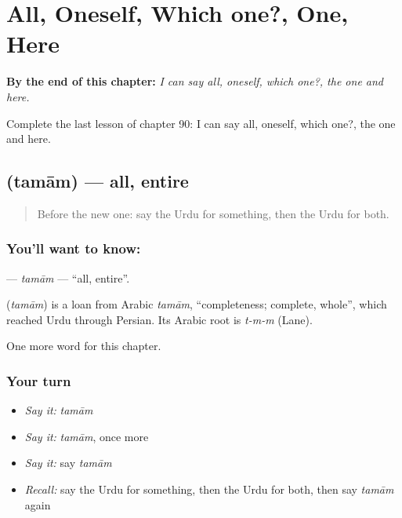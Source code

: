 
\chapter{All, Oneself, Which one?, One, Here}
\label{ch:ur-all-oneself-which-one-one-here}

\begin{chapteropening}
\textbf{By the end of this chapter:} \emph{I can say all, oneself, which one?, the one and here.}

Complete the last lesson of chapter 90: I can say all, oneself, which one?, the one and here.
\end{chapteropening}

\section[\texorpdfstring{\ur{تمام} (tamām)}{تمام (tamām)}]{ (tamām) — all, entire}

\label{lesson:UR-C90-tamam}



\begin{quote}
Before the new one: say the Urdu for something, then the Urdu for both.
\end{quote}

\subsection*{You'll want to know: }
\textbf{} — \emph{tamām} — \textquotedblleft{}all, entire\textquotedblright{}.

\begin{cousinweb}
\textbf{} (\emph{tamām}) is a loan from Arabic \emph{tamām}, \textquotedblleft{}completeness; complete, whole\textquotedblright{}, which reached Urdu through Persian. Its Arabic root is \emph{t-m-m} (Lane).
\end{cousinweb}

\begin{grammarlens}[title={What you've built}]
One more word for this chapter.
\end{grammarlens}

\subsection*{Your turn}
\begin{itemize}
\raggedright
  \item \emph{Say it:} \emph{tamām}
  \item \emph{Say it:} \emph{tamām}, once more
  \item \emph{Say it:} say \emph{tamām}
  \item \emph{Recall:} say the Urdu for something, then the Urdu for both, then say \emph{tamām} again
\end{itemize}

